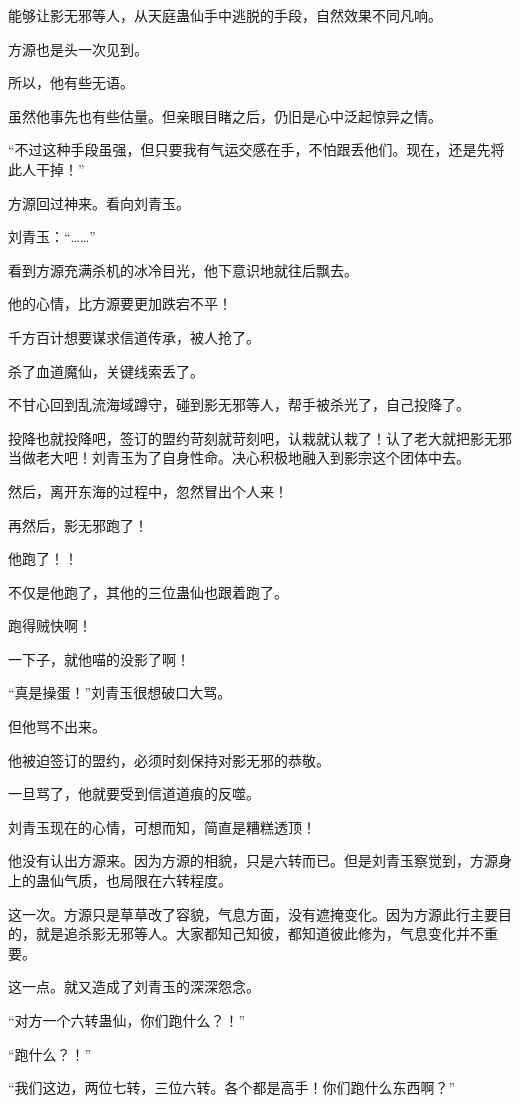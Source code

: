 \begin{this_body}
能够让影无邪等人，从天庭蛊仙手中逃脱的手段，自然效果不同凡响。

方源也是头一次见到。

所以，他有些无语。

虽然他事先也有些估量。但亲眼目睹之后，仍旧是心中泛起惊异之情。

“不过这种手段虽强，但只要我有气运交感在手，不怕跟丢他们。现在，还是先将此人干掉！”

方源回过神来。看向刘青玉。

刘青玉：“……”

看到方源充满杀机的冰冷目光，他下意识地就往后飘去。

他的心情，比方源要更加跌宕不平！

千方百计想要谋求信道传承，被人抢了。

杀了血道魔仙，关键线索丢了。

不甘心回到乱流海域蹲守，碰到影无邪等人，帮手被杀光了，自己投降了。

投降也就投降吧，签订的盟约苛刻就苛刻吧，认栽就认栽了！认了老大就把影无邪当做老大吧！刘青玉为了自身性命。决心积极地融入到影宗这个团体中去。

然后，离开东海的过程中，忽然冒出个人来！

再然后，影无邪跑了！

他跑了！！

不仅是他跑了，其他的三位蛊仙也跟着跑了。

跑得贼快啊！

一下子，就他喵的没影了啊！

“真是操蛋！”刘青玉很想破口大骂。

但他骂不出来。

他被迫签订的盟约，必须时刻保持对影无邪的恭敬。

一旦骂了，他就要受到信道道痕的反噬。

刘青玉现在的心情，可想而知，简直是糟糕透顶！

他没有认出方源来。因为方源的相貌，只是六转而已。但是刘青玉察觉到，方源身上的蛊仙气质，也局限在六转程度。

这一次。方源只是草草改了容貌，气息方面，没有遮掩变化。因为方源此行主要目的，就是追杀影无邪等人。大家都知己知彼，都知道彼此修为，气息变化并不重要。

这一点。就又造成了刘青玉的深深怨念。

“对方一个六转蛊仙，你们跑什么？！”

“跑什么？！”

“我们这边，两位七转，三位六转。各个都是高手！你们跑什么东西啊？”


\end{this_body}
